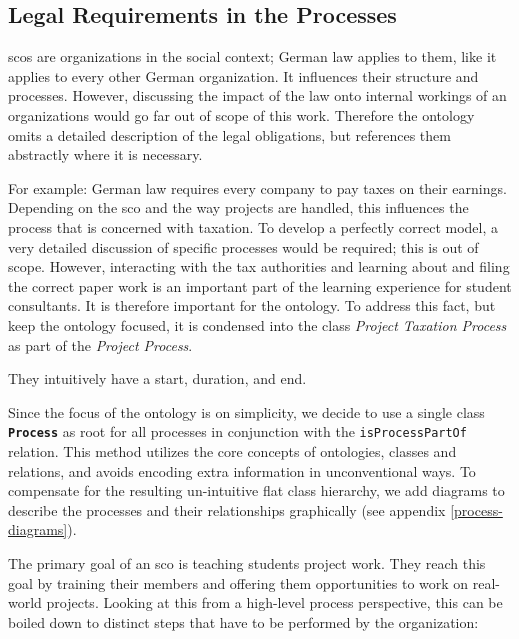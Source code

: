 \documentclass[a4paper, DIV=13, BCOR=0cm]{scrbook}
\newcommand{\class}[1]{\texttt{\textbf{#1}}}
\newcommand{\relation}[1]{\texttt{#1}}
\begin{document}
\subsection{Legal Requirements in the Processes}
\glspl{sco} are organizations in the social context; German law applies to them, like it applies to every other German organization. It influences their structure and processes. However, discussing the impact of the law onto internal workings of an organizations would go far out of scope of this work. Therefore the ontology omits a detailed description of the legal obligations, but references them abstractly where it is necessary.

For example: German law requires every company to pay taxes on their earnings. Depending on the \gls{sco} and the way projects are handled, this influences the process that is concerned with taxation. To develop a perfectly correct model, a very detailed discussion of specific processes would be required; this is out of scope. However, interacting with the tax authorities and learning about and filing the correct paper work is an important part of the learning experience for student consultants. It is therefore important for the ontology. To address this fact, but keep the ontology focused, it is condensed into the class \textit{Project Taxation Process} as part of the \textit{Project Process}.


They intuitively have a start, duration, and end.

Since the focus of the ontology is on simplicity, we decide to use a single  class \class{Process} as root for all processes in conjunction with the \relation{isProcessPartOf} relation. This method utilizes the core concepts of ontologies, classes and relations, and avoids encoding extra information in unconventional ways. To compensate for the resulting un-intuitive flat class hierarchy, we add diagrams to describe the processes and their relationships graphically (see appendix \ref{process-diagrams}).

The primary goal of an \gls{sco} is teaching students project work. They reach this goal by training their members and offering them opportunities to work on real-world projects. Looking at this from a high-level process perspective, this can be boiled down to distinct steps that have to be performed by the organization:
\end{document}
